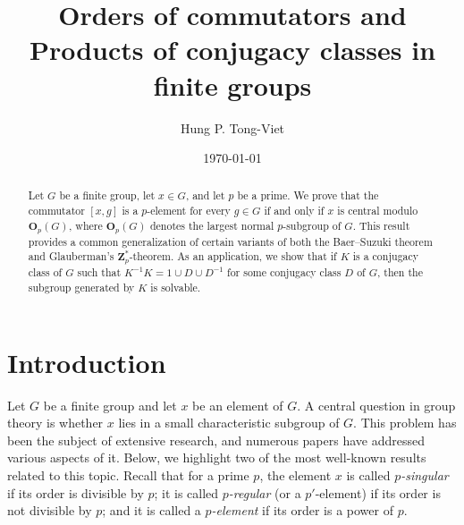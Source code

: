 \documentclass[twoside,a4paper,reqno,12pt]{amsart}
\newcommand{\<}{\langle}
\renewcommand{\>}{\rangle}
\renewcommand{\:}{\colon}
\theoremstyle{definition}
\begin{document}
\title[Orders of commutators]{Orders of commutators and Products of conjugacy classes in finite groups}






\author{Hung P. Tong-Viet}
\address{H.P. Tong-Viet, Department of Mathematics and Statistics, Binghamton University, Binghamton, NY 13902-6000, USA}



\begin{abstract}
Let $G$ be a finite group, let $x \in G$, and let $p$ be a prime. We prove that the commutator $[x,g]$ is a $p$-element for every $g \in G$ if and only if $x$ is central modulo $\mathbf{O}_p(G)$, where $\mathbf{O}_p(G)$ denotes the largest normal $p$-subgroup of $G$. This result provides a common generalization of certain variants of both the Baer--Suzuki theorem and Glauberman's $\mathbf{Z}_p^*$-theorem. As an application, we show that if $K$ is a conjugacy class of $G$ such that $K^{-1}K = 1 \cup D \cup D^{-1}$ for some conjugacy class $D$ of $G$, then the subgroup generated by $K$ is solvable.
\end{abstract}

\date{\today}

\maketitle


\section{Introduction}\label{s:intro}

Let $G$ be a finite group and let $x$ be an element of $G$. A central question in group theory is whether $x$ lies in a small characteristic subgroup of $G$. This problem has been the subject of extensive research, and numerous papers have addressed various aspects of it. Below, we highlight two of the most well-known results related to this topic.
Recall that for a prime $p$, the element $x$ is called \emph{$p$-singular} if its order is divisible by $p$; it is called \emph{$p$-regular} (or a $p'$-element) if its order is not divisible by $p$; and it is called a \emph{$p$-element} if its order is a power of $p.$ 
\end{document}
